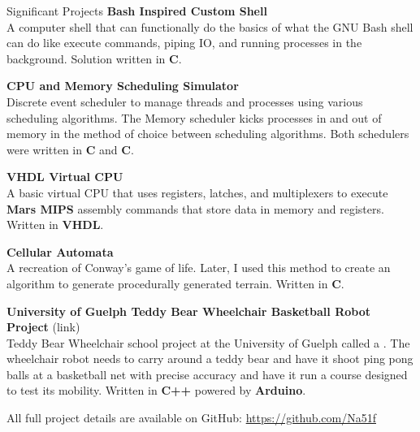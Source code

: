 \documentclass{resume}
\begin{document}
    \begin{rSection}{Significant Projects}
        \textbf{Bash Inspired Custom Shell} \\
        A computer shell that can functionally do the basics of what the GNU Bash shell can do like execute commands, piping IO, and running processes in the background. Solution written in \textbf{C}.

        \textbf{CPU and Memory Scheduling Simulator} \\
        Discrete event scheduler to manage threads and processes using various scheduling algorithms. The Memory scheduler kicks processes in and out of memory in the method of choice between scheduling algorithms. Both schedulers were written in \textbf{C} and \textbf{C}.

        \textbf{VHDL Virtual CPU} \\
        A basic virtual CPU that uses registers, latches, and multiplexers to execute \textbf{Mars MIPS} assembly commands that store data in memory and registers. Written in \textbf{VHDL}.

        \textbf{Cellular Automata} \\ 
        A recreation of Conway's game of life. Later, I used this method to create an algorithm to generate procedurally generated terrain. Written in \textbf{C}.
        
        \textbf{University of Guelph Teddy Bear Wheelchair Basketball Robot Project} (link) \\ 
        Teddy Bear Wheelchair school project at the University of Guelph called a . The wheelchair robot needs to carry around a teddy bear and have it shoot ping pong balls at a basketball net with precise accuracy and have it run a course designed to test its mobility. Written in \textbf{C++} powered by \textbf{Arduino}.

        {All full project details are available on GitHub: \url{https://github.com/Na51f}}
    \end{rSection}
\end{document}
